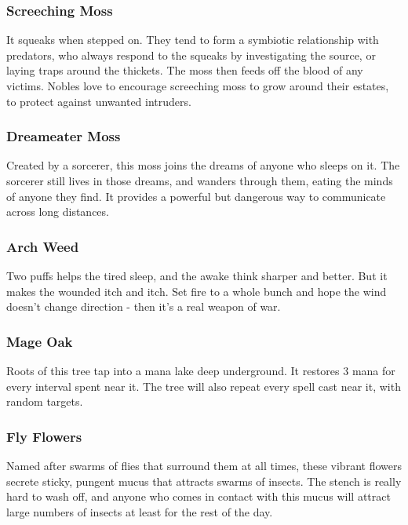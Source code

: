 \begin{multicols}{2}
\subsubsection{Screeching Moss}

It squeaks when stepped on.
They tend to form a symbiotic relationship with predators, who always respond to the squeaks by investigating the source, or laying traps around the thickets.
The moss then feeds off the blood of any victims.
Nobles love to encourage screeching moss to grow around their estates, to protect against unwanted intruders.

\subsubsection{Dreameater Moss}

Created by a sorcerer, this moss joins the dreams of anyone who sleeps on it.
The sorcerer still lives in those dreams, and wanders through them, eating the minds of anyone they find.
It provides a powerful but dangerous way to communicate across long distances.

\subsubsection{Arch Weed}

Two puffs helps the tired sleep, and the awake think sharper and better.
But it makes the wounded itch and itch.
Set fire to a whole bunch and hope the wind doesn't change direction - then it's a real weapon of war.

\subsubsection{Mage Oak}

Roots of this tree tap into a mana lake deep underground. It restores 3 mana for every interval spent near it.
The tree will also repeat every spell cast near it, with random targets.

\subsubsection{Fly Flowers}

Named after swarms of flies that surround them at all times, these vibrant flowers secrete sticky, pungent mucus that attracts swarms 
of insects. The stench is really hard to wash off, and anyone who comes in contact with this mucus will attract large numbers of 
insects at least for the rest of the day.


\end{multicols}
